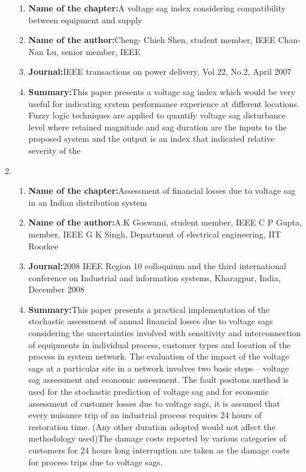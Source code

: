 \documentclass[12pt, a4paper]{extreport}
\begin{document}
\begin{enumerate}
\begin{enumerate}
        \item{\textbf{Name of the chapter:}}A voltage sag
index
considering
compatibility
between
equipment and
supply
\item{\textbf{Name of the author:}}Cheng- Chieh
Shen, student
member, IEEE
Chan-Nan Lu,
senior member,
IEEE
\item{\textbf{Journal:}}IEEE
transactions
on power
delivery, Vol
22, No.2,
April 2007
\item{\textbf{Summary:}}This paper presents a
voltage sag index which
would be very useful for
indicating system
performance experience at
different locations. Fuzzy
logic techniques are
applied to quantify
voltage sag disturbance
level where retained
magnitude and sag
duration are the inputs to
the proposed system and
the output is an index
that indicated relative
severity of the
\end{enumerate}
\item \begin{enumerate}
\item{\textbf{Name of the chapter:}}Assessment of
financial losses
due to voltage
sag in an Indian
distribution
system
\item{\textbf{Name of the author:}}A.K Goswami,
student
member, IEEE
C P Gupta,
member, IEEE
G K Singh,
Department of
electrical
engineering,
IIT Roorkee
\item{\textbf{Journal:}}2008 IEEE
Region 10
colloquium
and the third
international
conference on
Industrial and
information
systems,
Kharagpur,
India,
December
2008
\item{\textbf{Summary:}}This paper presents a
practical implementation
of the stochastic
assessment of annual
financial losses due to
voltage sags considering
the uncertainties involved
with sensitivity and
interconnection of
equipments in individual
process, customer types
and location of the
process in system
network. The evaluation
of the impact of the
voltage sags at a
particular site in a
network involves two
basic steps – voltage sag
assessment and economic
assessment. The fault
positons method is used
for the stochastic
prediction of voltage sag
and for economic
assessment of customer
losses due to voltage sags,
it is assumed that every
nuisance trip of an
industrial process requires
24 hours of restoration
time. (Any other duration
adopted would not affect
the methodology used)The damage costs
reported by various
categories of customers
for 24 hours long
interruption are taken as
the damage costs for
process trips due to
voltage sags.


\end{enumerate}
\end{enumerate}
\end{document}
